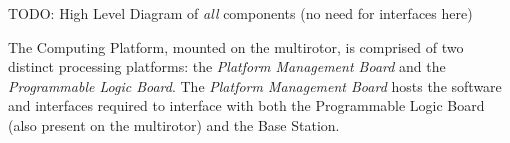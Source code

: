 TODO: High Level Diagram of \textit{all} components (no need for interfaces here)

The Computing Platform, mounted on the multirotor, is comprised of two distinct processing platforms: the \textit{Platform Management Board} and the \textit{Programmable Logic Board}. The \textit{Platform Management Board} hosts the software and interfaces required to interface with both the Programmable Logic Board (also present on the multirotor) and the Base Station.